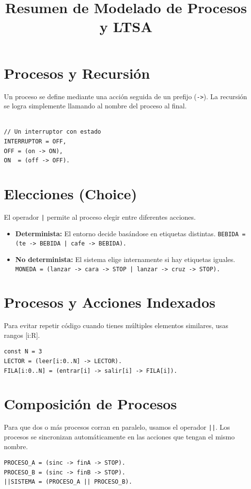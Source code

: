 \documentclass[11pt,a4paper]{article}
\begin{document}
\title{Resumen de Modelado de Procesos y LTSA}
\maketitle

\section{Procesos y Recursión}
Un proceso se define mediante una acción seguida de un prefijo (\texttt{->}). La recursión se logra simplemente llamando al nombre del proceso al final.

\begin{lstlisting}

// Un interruptor con estado
INTERRUPTOR = OFF,
OFF = (on -> ON),
ON  = (off -> OFF).
\end{lstlisting}

\section{Elecciones (Choice)}
El operador \texttt{|} permite al proceso elegir entre diferentes acciones.
\begin{itemize}
    \item \textbf{Determinista:} El entorno decide basándose en etiquetas distintas.
    \texttt{BEBIDA = (te -> BEBIDA | cafe -> BEBIDA).}
    \item \textbf{No determinista:} El sistema elige internamente si hay etiquetas iguales.
    \texttt{MONEDA = (lanzar -> cara -> STOP | lanzar -> cruz -> STOP).}
\end{itemize}

\section{Procesos y Acciones Indexados}
Para evitar repetir código cuando tienes múltiples elementos similares, usas rangos [i:R].
\begin{lstlisting}
const N = 3
LECTOR = (leer[i:0..N] -> LECTOR).
FILA[i:0..N] = (entrar[i] -> salir[i] -> FILA[i]).
\end{lstlisting}

\section{Composición de Procesos}
Para que dos o más procesos corran en paralelo, usamos el operador \texttt{||}. Los procesos se sincronizan automáticamente en las acciones que tengan el mismo nombre.
\begin{lstlisting}
PROCESO_A = (sinc -> finA -> STOP).
PROCESO_B = (sinc -> finB -> STOP).
||SISTEMA = (PROCESO_A || PROCESO_B).
\end{lstlisting}
\end{document}
